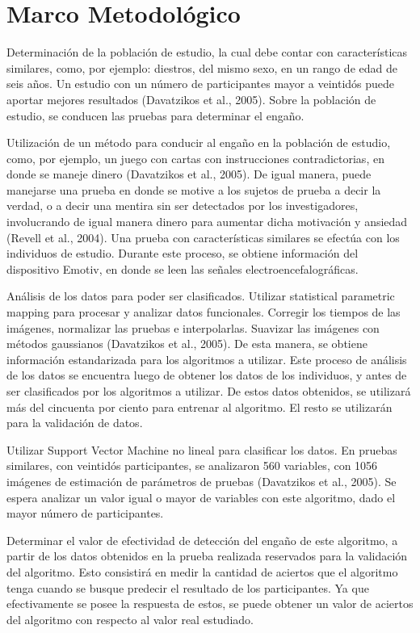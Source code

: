 \chapter{Marco Metodológico}
Determinación de la población de estudio, la cual debe contar con características similares, como, por ejemplo: diestros, del mismo sexo, en un rango de edad de seis años. Un estudio con un número de participantes mayor a veintidós puede aportar mejores resultados (Davatzikos et al., 2005). Sobre la población de estudio, se conducen las pruebas para determinar el engaño. 

Utilización de un método para conducir al engaño en la población de estudio, como, por ejemplo, un juego con cartas con instrucciones contradictorias, en donde se maneje dinero (Davatzikos et al., 2005). De igual manera, puede manejarse una prueba en donde se motive a los sujetos de prueba a decir la verdad, o a decir una mentira sin ser detectados por los investigadores, involucrando de igual manera dinero para aumentar dicha motivación y ansiedad (Revell et al., 2004). Una prueba con características similares se efectúa con los individuos de estudio. Durante este proceso, se obtiene información del dispositivo Emotiv, en donde se leen las señales electroencefalográficas. 

Análisis de los datos para poder ser clasificados. Utilizar statistical parametric mapping para procesar y analizar datos funcionales. Corregir los tiempos de las imágenes, normalizar las pruebas e interpolarlas. Suavizar las imágenes con métodos gaussianos (Davatzikos et al., 2005). De esta manera, se obtiene información estandarizada para los algoritmos a utilizar. Este proceso de análisis de los datos se encuentra luego de obtener los datos de los individuos, y antes de ser clasificados por los algoritmos a utilizar. De estos datos obtenidos, se utilizará más del cincuenta por ciento para entrenar al algoritmo. El resto se utilizarán para la validación de datos. 

Utilizar Support Vector Machine no lineal para clasificar los datos. En pruebas similares, con veintidós participantes, se analizaron 560 variables, con 1056 imágenes de estimación de parámetros de pruebas (Davatzikos et al., 2005). Se espera analizar un valor igual o mayor de variables con este algoritmo, dado el mayor número de participantes.

Determinar el valor de efectividad de detección del engaño de este algoritmo, a partir de los datos obtenidos en la prueba realizada reservados para la validación del algoritmo. Esto consistirá en medir la cantidad de aciertos que el algoritmo tenga cuando se busque predecir el resultado de los participantes. Ya que efectivamente se posee la respuesta de estos, se puede obtener un valor de aciertos del algoritmo con respecto al valor real estudiado.   

